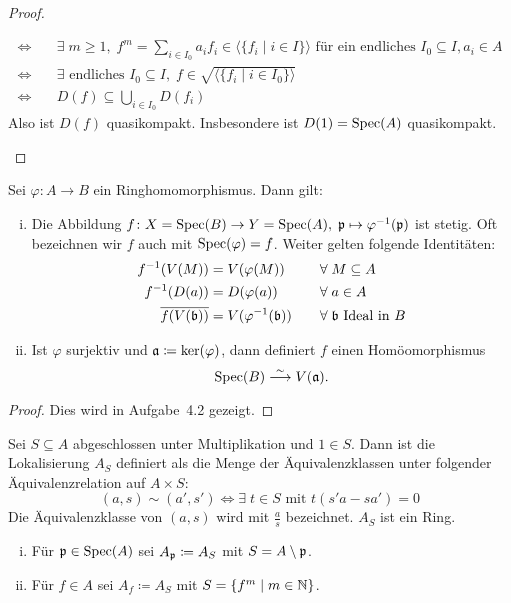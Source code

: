 \begin{prop}
\begin{proof}
\begin{enumerate}[i)]
\begin{align*}
				\Longleftrightarrow \quad & \exists\; m \ge 1,\; f^m = \sum_{i\in I_0} a_i f_i \in \langle \{f_i \mid i \in I\}\rangle \text{ für ein endliches }I_0 \subseteq I, a_i \in A\\
				\Longleftrightarrow \quad & \exists \text{ endliches } I_0 \subseteq I,\; f \in \sqrt{\langle\{f_i\mid i \in I_0\}\rangle}\\
				\Longleftrightarrow \quad & D(f) \subseteq \bigcup_{i \in I_0} D(f_i)
			\end{align*}
			Also ist $D(f)$ quasikompakt. Insbesondere ist $D(1) = \operatorname{Spec}(A)$ quasikompakt.
		\end{enumerate}
	\end{proof}
\end{prop}

\begin{prop}
	Sei $\varphi\colon A \to B$ ein Ringhomomorphismus. Dann gilt:
	\begin{enumerate}[i)]
		\item Die Abbildung $f\colon X = \operatorname{Spec}(B) \to Y = \operatorname{Spec}(A),\; \mathfrak{p} \mapsto \varphi^{-1}(\mathfrak{p})$ ist stetig. Oft bezeichnen wir $f$ auch mit $\operatorname{Spec}(\varphi) = f$. Weiter gelten folgende Identitäten:
		\begin{alignat*}{2}
			f^{-1}(V(M)) &= V(\varphi(M)) \quad &&\forall \;M \subseteq A\\
			f^{-1}(D(a)) &= D(\varphi(a)) \quad &&\forall \;a \in A\\
			\overline{f(V(\mathfrak{b}))} &= V(\varphi^{-1}(\mathfrak{b})) \quad &&\forall\; \mathfrak{b} \text{ Ideal in } B
		\end{alignat*}
		\item Ist $\varphi$ surjektiv und $\mathfrak{a} \coloneqq \ker(\varphi)$, dann definiert $f$ einen Homöomorphismus
		\[
			\operatorname{Spec}(B) \overset{\sim}{\longrightarrow} V(\mathfrak{a}).
		\]
	\end{enumerate}
	
	\begin{proof}
		Dies wird in Aufgabe~4.2 gezeigt.
	\end{proof}
\end{prop}

\begin{eri}
	Sei $S \subseteq A$ abgeschlossen unter Multiplikation und $1 \in S$. Dann ist die Lokalisierung $A_S$ definiert als die Menge der Äquivalenzklassen unter folgender Äquivalenzrelation auf $A \times S$:
	\[
		(a,s)\sim(a',s') \Longleftrightarrow \exists\; t \in S \text{ mit } t(s'a-sa') = 0
	\]
	Die Äquivalenzklasse von $(a,s)$ wird mit $\frac{a}{s}$ bezeichnet. $A_S$ ist ein Ring.
	\begin{enumerate}[i)]
		\item Für $\mathfrak{p} \in \operatorname{Spec}(A)$ sei $A_{\mathfrak{p}}\coloneqq A_S$ mit $S=A\setminus \mathfrak{p}$.
		\item Für $f \in A$ sei $A_f \coloneqq A_S$ mit $S = \{f^m \mid m \in \mathbb {N} \}$.
	\end{enumerate}
\end{eri}

